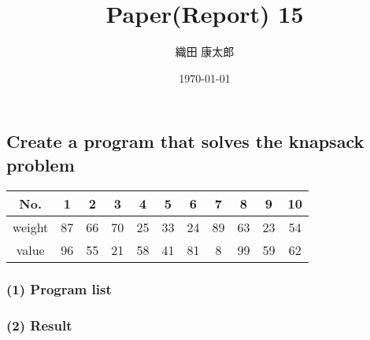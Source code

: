 \documentclass[a4paper]{jarticle}
\title{Paper(Report) 15}
\author{織田 康太郎}
\date{\today}
\begin{document}
\maketitle

\subsection*{Create a program that solves the knapsack problem}
\begin{table}[hbtp]
  \centering
  \begin{tabular}{|c|c|c|c|c|c|c|c|c|c|c|}
    \hline
    No. & 1 & 2 & 3 & 4 & 5 & 6 & 7 & 8 & 9 & 10 \\
    \hline 
    weight & 87 & 66 & 70 & 25 & 33 & 24 & 89 & 63 & 23 & 54 \\
    \hline
    value & 96 & 55 & 21 & 58 & 41 & 81 & 8 & 99 & 59 & 62 \\
    \hline
  \end{tabular}
\end{table}

\subsubsection*{(1) Program list}


\vspace{-3mm}
\subsubsection*{(2) Result}

\end{document}
